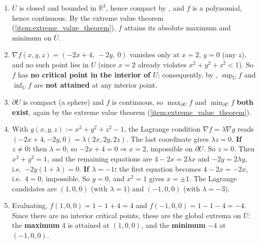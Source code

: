 \begin{exercisesolution}
\begin{enumerate}[label=\textbf{\arabic*.}]
  \item $\overline{U}$ is closed and bounded in $\mathbb{R}^3$, hence compact by
    , and $f$ is a polynomial, hence continuous. By the extreme value
    theorem (\cref{item:extreme_value_theorem}), $f$ attains its absolute maximum and minimum on
    $\overline{U}$.
  \item $\nabla f(x,y,z) = (-2x+4,\ -2y,\ 0)$ vanishes only at $x=2$, $y=0$ (any $z$), and no such
    point lies in $U$ (since $x=2$ already violates $x^2+y^2+z^2<1$). So $f$ has \textbf{no
    critical point in the interior of $U$}; consequently, by
    , $\sup_U f$ and $\inf_U f$ are \textbf{not attained} at
    any interior point.
  \item $\partial U$ is compact (a sphere) and $f$ is continuous, so $\max_{\partial U} f$ and
    $\min_{\partial U} f$ \textbf{both exist}, again by the extreme value theorem
    (\cref{item:extreme_value_theorem}).
  \item With $g(x,y,z) := x^2+y^2+z^2-1$, the Lagrange condition $\nabla f = \lambda \nabla g$
    reads $(-2x+4,-2y,0) = \lambda(2x,2y,2z)$. The last coordinate gives $\lambda z = 0$.
    \textbf{If $z \neq 0$:} then $\lambda = 0$, so $-2x+4=0 \Rightarrow x=2$, impossible on
    $\partial U$. So $z = 0$. Then $x^2+y^2=1$, and the remaining equations are
    $4-2x = 2\lambda x$ and $-2y = 2\lambda y$, i.e.\ $-2y(1+\lambda) = 0$.
    \textbf{If $\lambda = -1$:} the first equation becomes $4-2x=-2x$, i.e.\ $4=0$, impossible.
    So $y = 0$, and $x^2=1$ gives $x = \pm 1$. The Lagrange candidates are
    $(1,0,0)$ (with $\lambda = 1$) and $(-1,0,0)$ (with $\lambda = -3$).
  \item Evaluating, $f(1,0,0) = 1-1+4 = 4$ and $f(-1,0,0) = 1-1-4 = -4$. Since there are no
    interior critical points, these are the global extrema on $\overline{U}$: the
    \textbf{maximum} $4$ is attained at $(1,0,0)$, and the \textbf{minimum} $-4$ at $(-1,0,0)$.
\end{enumerate}
\end{exercisesolution}

